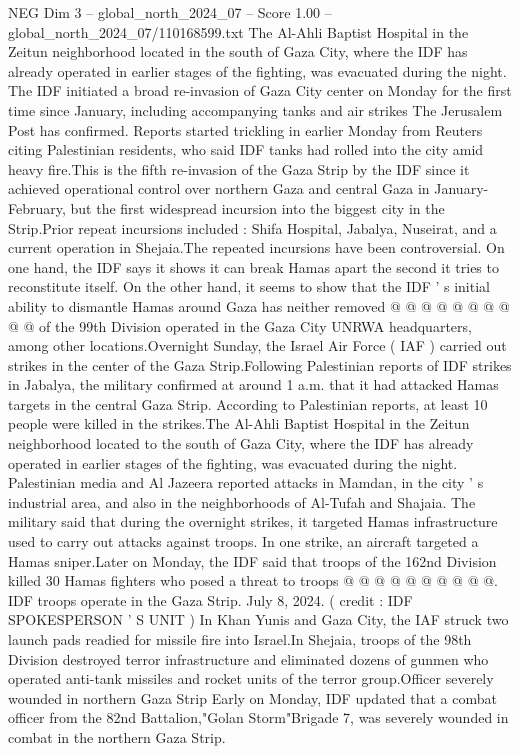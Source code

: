 \begin{textsample}{NEG Dim 3 – global\_north\_2024\_07 – Score 1.00 – global\_north\_2024\_07/110168599.txt}  \label{ex:f3_neg_378}
The Al-Ahli Baptist Hospital in the Zeitun neighborhood located in the south of Gaza City, where the IDF has already operated in earlier stages of the fighting, was evacuated during the night.
The IDF initiated a broad re-invasion of Gaza City center on Monday for the first time since January, including accompanying tanks and air strikes The Jerusalem Post has confirmed.
Reports started trickling in earlier Monday from Reuters citing Palestinian residents, who said IDF tanks had rolled into the city amid heavy fire.This is the fifth re-invasion of the Gaza Strip by the IDF since it achieved operational control over northern Gaza and central Gaza in January-February, but the first widespread incursion into the biggest city in the Strip.Prior repeat incursions included : Shifa Hospital, Jabalya, Nuseirat, and a current operation in Shejaia.The repeated incursions have been controversial.
On one hand, the IDF says it shows it can break Hamas apart the second it tries to reconstitute itself.
On the other hand, it seems to show that the IDF ' s initial ability to dismantle Hamas around Gaza has neither removed @ @ @ @ @ @ @ @ @ @ of the 99th Division operated in the Gaza City UNRWA headquarters, among other locations.Overnight Sunday, the Israel Air Force ( IAF ) carried out strikes in the center of the Gaza Strip.Following Palestinian reports of IDF strikes in Jabalya, the military confirmed at around 1 a.m. that it had attacked Hamas targets in the central Gaza Strip.
According to Palestinian reports, at least 10 people were killed in the strikes.The Al-Ahli Baptist Hospital in the Zeitun neighborhood located to the south of Gaza City, where the IDF has already operated in earlier stages of the fighting, was evacuated during the night.
Palestinian media and Al Jazeera reported attacks in Mamdan, in the city ' s industrial area, and also in the neighborhoods of Al-Tufah and Shajaia.
The military said that during the overnight strikes, it targeted Hamas infrastructure used to carry out attacks against troops.
In one strike, an aircraft targeted a Hamas sniper.Later on Monday, the IDF said that troops of the 162nd Division killed 30 Hamas fighters who posed a threat to troops @ @ @ @ @ @ @ @ @ @.
IDF troops operate in the Gaza Strip.
July 8, 2024. ( credit : IDF SPOKESPERSON ' S UNIT ) In Khan Yunis and Gaza City, the IAF struck two launch pads readied for missile fire into Israel.In Shejaia, troops of the 98th Division destroyed terror infrastructure and eliminated dozens of gunmen who operated anti-tank missiles and rocket units of the terror group.Officer severely wounded in northern Gaza Strip Early on Monday, IDF updated that a combat officer from the 82nd Battalion,"Golan Storm"Brigade 7, was severely wounded in combat in the northern Gaza Strip.

\end{textsample}
